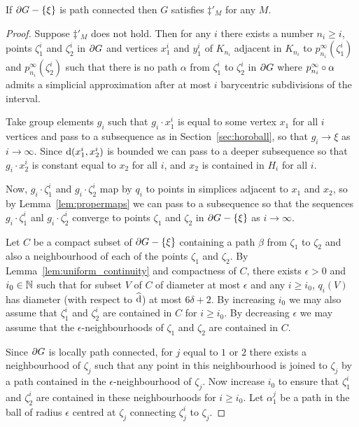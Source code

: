 \documentclass[a4paper]{article}
\begin{document}
\begin{proposition}
  If $\partial G - \left\{\xi\right\}$ is path connected then $G$ satisfies $\ddag'_M$
  for any $M$.
\end{proposition}

\begin{proof}
  Suppose $\ddag'_M$ does not hold. Then for any $i$ there exists a number $n_i
  \geq i$, points $\zeta_1^i$ and $\zeta_2^i$ in $\partial G$ and vertices
  $x_1^i$ and $y_1^i$ of $K_{n_i}$ adjacent in $K_{n_i}$ to
  $p^\infty_{n_i}(\zeta^i_1)$ and $p^\infty_{n_i}(\zeta^i_2)$ such that there
  is no path $\alpha$ from $\zeta_1^i$ to $\zeta_2^i$ in $\partial G$ where
  $p^\infty_{n_i}\circ\alpha$ admits a simplicial approximation after at
  most $i$ barycentric subdivisions of the interval.

  Take group elements $g_i$ such that $g_i\cdot x_1^i$ is equal to some vertex
  $x_1$ for all $i$ vertices and pass to a subsequence as in
  Section~\ref{sec:horoball}, so that $g_i\to\xi$ as $i \to\infty$. Since
  $\operatorname{d}(x_1^i, x_2^i)$ is bounded we can pass to a deeper subsequence so that
  $g_i\cdot x_2^i$ is constant equal to $x_2$ for all $i$, and $x_2$ is
  contained in $H_i$ for all $i$. 

  Now, $g_i\cdot \zeta_1^i$ and $g_i\cdot\zeta_2^i$ map by $q_i$ to points in
  simplices adjacent to $x_1$ and $x_2$, so by Lemma~\ref{lem:propermaps} we
  can pass to a subsequence so that the sequences $g_i\cdot \zeta_1^i$ anl
  $g_i\cdot\zeta_2^i$ converge to points $\zeta_1$ and $\zeta_2$ in $\partial
  G - \left\{\xi\right\}$ as $i \to \infty$.
  
  Let $C$ be a compact subset of $\partial G - \left\{\xi\right\}$ containing a path
  $\beta$ from $\zeta_1$ to $\zeta_2$ and also a neighbourhood of each of the
  points $\zeta_1$ and $\zeta_2$. By Lemma~\ref{lem:uniform_continuity} and
  compactness of $C$, there exists $\epsilon > 0$ and $i_0 \in \mathbb{N}$ such
  that for subset $V$ of $C$ of diameter at most $\epsilon$ and any $i \geq
  i_0$, $q_i(V)$ has diameter (with respect to $\operatorname{\widehat{d}}$) at most $6\delta+2$.
  By increasing $i_0$ we may also assume that $\zeta_1^i$ and $\zeta_2^i$ are
  contained in $C$ for $i \geq i_0$. By decreasing $\epsilon$ we may assume
  that the $\epsilon$-neighbourhoods of $\zeta_1$ and $\zeta_2$ are contained
  in $C$. 

  Since $\partial G$ is locally path connected, for $j$ equal to $1$ or $2$
  there exists a neighbourhood of $\zeta_j$ such that any point in this
  neighbourhood is joined to $\zeta_j$ by a path contained in the
  $\epsilon$-neighbourhood of $\zeta_j$. Now increase $i_0$ to ensure that
  $\zeta_1^i$ and $\zeta_2^i$ are contained in these neighbourhoods for $i \geq
  i_0$. Let $\alpha_1^j$ be a path in the ball of radius $\epsilon$ centred at
  $\zeta_j$ connecting $\zeta_j^i$ to $\zeta_j$.


\end{proof}
\end{document}

